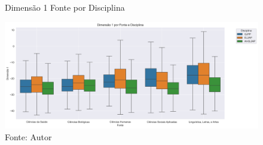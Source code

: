 \begin{figure}[htbp]
    \centering
    \captionsetup{justification = raggedright, singlelinecheck = false}
    \caption{Dimensão 1 Fonte por Disciplina}
    \label{fig:dim1_by_source_by_discipline_ptbr}
    \includegraphics[scale=0.7]{figures/dim1_by_source_by_discipline_ptbr.png}
    \caption*{Fonte: Autor}
\end{figure}
